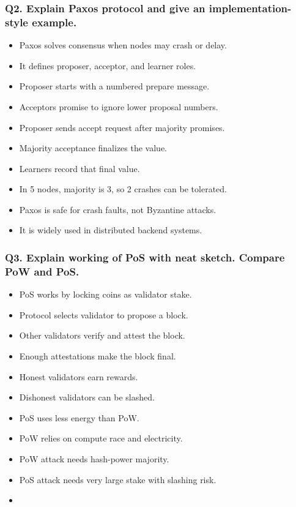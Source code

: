 \documentclass[12pt,a4paper]{article}
\begin{document}
\subsubsection*{Q2. Explain Paxos protocol and give an implementation-style example.}
\begin{itemize}
\item Paxos solves consensus when nodes may crash or delay.
\item It defines proposer, acceptor, and learner roles.
\item Proposer starts with a numbered prepare message.
\item Acceptors promise to ignore lower proposal numbers.
\item Proposer sends accept request after majority promises.
\item Majority acceptance finalizes the value.
\item Learners record that final value.
\item In 5 nodes, majority is 3, so 2 crashes can be tolerated.
\item Paxos is safe for crash faults, not Byzantine attacks.
\item It is widely used in distributed backend systems.
\end{itemize}

\subsubsection*{Q3. Explain working of PoS with neat sketch. Compare PoW and PoS.}
\begin{itemize}
\item PoS works by locking coins as validator stake.
\item Protocol selects validator to propose a block.
\item Other validators verify and attest the block.
\item Enough attestations make the block final.
\item Honest validators earn rewards.
\item Dishonest validators can be slashed.
\item PoS uses less energy than PoW.
\item PoW relies on compute race and electricity.
\item PoW attack needs hash-power majority.
\item PoS attack needs very large stake with slashing risk.
\item[]
\vspace{0.25em}
\noindent{}
\end{itemize}
\end{document}
